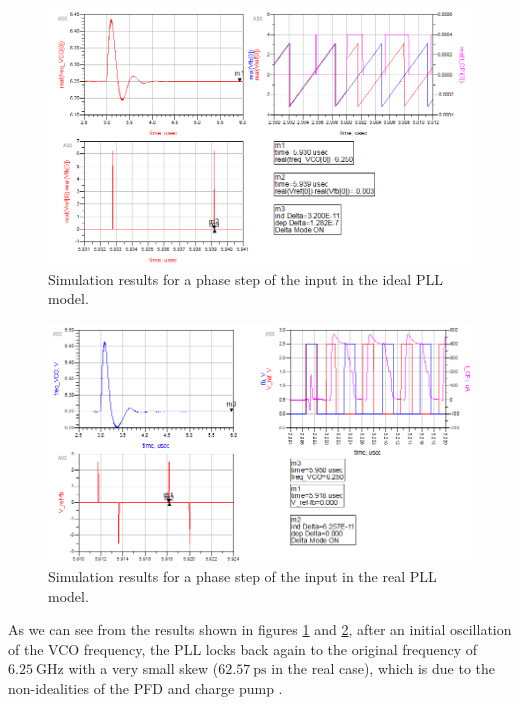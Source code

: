 \documentclass[lettersize,journal]{IEEEtran}
\begin{document}
\begin{figure}[!ht]
    \centering
    \includegraphics[width=1\linewidth]{images/ads_results/phase_step/phase_step_ideal.png}
    \caption{Simulation results for a phase step of the input in the ideal PLL model.}
    \label{fig:phase_step_ideal_res}
\end{figure}

\begin{figure}[!ht]
    \centering
    \includegraphics[width=1\linewidth]{images/ads_results/phase_step/phase_step_real.png}
    \caption{Simulation results for a phase step of the input in the real PLL model.}
    \label{fig:phase_step_real_res}
\end{figure}

As we can see from the results shown in figures \ref{fig:phase_step_ideal_res} and \ref{fig:phase_step_real_res}, after an initial oscillation of the VCO frequency, the PLL locks back again to the original frequency of $\SI{6.25}{\giga\hertz}$ with a very small skew ($\SI{62.57}{\pico\second}$ in the real case), which is due to the non-idealities of the PFD and charge pump \cite{razavi_current_mismatch}.
\end{document}
